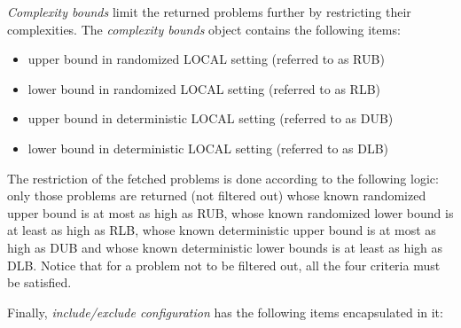 \emph{Complexity bounds} limit the returned problems further by
restricting their complexities. The \emph{complexity bounds} object
contains the following items:

\begin{itemize}
  \item upper bound in randomized LOCAL setting (referred to as RUB)
  \item lower bound in randomized LOCAL setting (referred to as RLB)
  \item upper bound in deterministic LOCAL setting (referred to as DUB)
  \item lower bound in deterministic LOCAL setting (referred to as DLB)
\end{itemize}

The restriction of the fetched problems is done according to the
following logic: only those problems are returned (not filtered out)
whose known randomized upper bound is at most as high as RUB, whose
known randomized lower bound is at least as high as RLB, whose
known deterministic upper bound is at most as high as DUB and whose
known deterministic lower bounds is at least as high as DLB. Notice that
for a problem not to be filtered out, all the four criteria must be
satisfied.

Finally, \emph{include/exclude configuration} has the following
items encapsulated in it:

